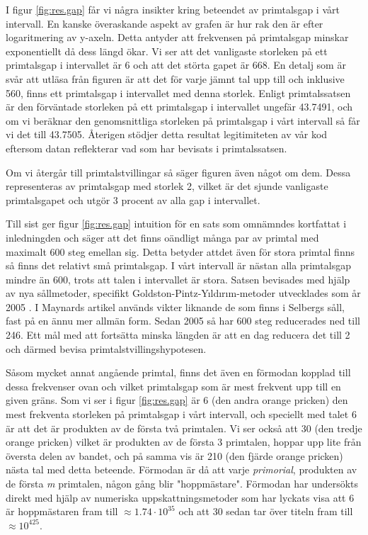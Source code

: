 I figur \ref{fig:res.gap} får vi några insikter kring beteendet av primtalsgap i vårt intervall. 
En kanske överaskande aspekt av grafen är hur rak den är efter logaritmering av y-axeln.
Detta antyder att frekvensen på primtalsgap minskar exponentiellt då dess längd ökar. 
Vi ser att det vanligaste storleken på ett primtalsgap i intervallet är 6 och att det störta gapet är 668.
En detalj som är svår att utläsa från figuren är att det för varje jämnt tal upp till och inklusive 560, finns ett primtalsgap i intervallet med denna storlek.
Enligt primtalssatsen är den förväntade storleken på ett primtalsgap i intervallet ungefär 43.7491, och om vi beräknar den genomsnittliga storleken på primtalsgap i vårt intervall så får vi det till 43.7505.
Återigen stödjer detta resultat legitimiteten av vår kod eftersom datan reflekterar vad som har bevisats i primtalssatsen.

Om vi återgår till primtalstvillingar så säger figuren även något om dem. 
Dessa representeras av primtalsgap med storlek 2, vilket är det sjunde vanligaste primtalsgapet och utgör 3 procent av alla gap i intervallet.

Till sist ger figur \ref{fig:res.gap} intuition för en sats som omnämndes kortfattat i inledningden och säger att det finns oändligt många par av primtal med maximalt 600 steg emellan sig. 
Detta betyder attdet även för stora primtal finns så finns det relativt små primtalsgap.
I vårt intervall är nästan alla primtalsgap mindre än 600, trots att talen i intervallet är stora.
Satsen bevisades med hjälp av nya sållmetoder, specifikt Goldston-Pintz-Yıldırım-metoder utvecklades som år 2005 \cite{GPY}.
I Maynards artikel används vikter liknande de som finns i Selbergs såll, fast på en ännu mer allmän form. 
Sedan 2005 så har 600 steg reducerades ned till 246. 
Ett mål med att fortsätta minska längden är att en dag reducera det till 2 och därmed bevisa primtalstvillingshypotesen.

Såsom mycket annat angående primtal, finns det även en förmodan kopplad till dessa frekvenser ovan och vilket primtalsgap som är mest frekvent upp till en given gräns. 
Som vi ser i figur \ref{fig:res.gap} är 6 (den andra orange pricken) den mest frekventa storleken på primtalsgap i vårt intervall, och speciellt med talet 6 är att det är produkten av de första två primtalen. 
Vi ser också att 30 (den tredje orange pricken) vilket är produkten av de första 3 primtalen, hoppar upp lite från översta delen av bandet, och på samma vis är 210 (den fjärde orange pricken) nästa tal med detta beteende. Förmodan är då att varje \textit{primorial}, produkten av de första \textit{m} primtalen, någon gång blir "hoppmästare".
Förmodan har undersökts direkt med hjälp av numeriska uppskattningsmetoder \cite{primeGaps} som har lyckats visa att 6 är hoppmästaren fram till \(\approx 1.74\cdot10^{35}\) och att 30 sedan tar över titeln fram till \(\approx 10^{425}\).

